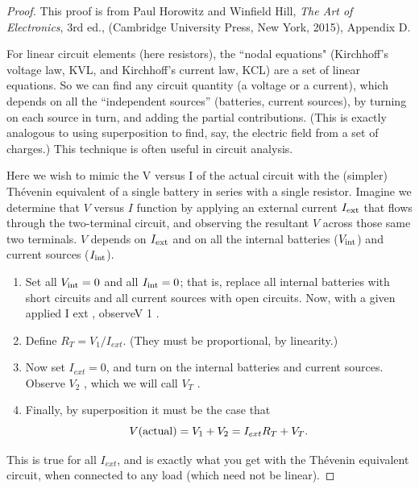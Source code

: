 \documentclass[UTF8]{article}
\begin{document}
\begin{proof}
This proof is from Paul Horowitz and Winfield Hill, \textit{The Art of Electronics}, 
3rd ed., (Cambridge University Press, New York, 2015), Appendix D.

For linear circuit elements (here resistors), the ``nodal 
equations" (Kirchhoff's voltage law, KVL, and Kirchhoff's current 
law, KCL) are a set of linear equations. So we can
find any circuit quantity (a voltage or a current), which depends 
on all the ``independent sources'' (batteries, current
sources), by turning on each source in turn, and adding the
partial contributions. (This is exactly analogous to using
superposition to find, say, the electric field from a set of
charges.) This technique is often useful in circuit analysis.

Here we wish to mimic the V versus I of the actual circuit 
with the (simpler) Th\'{e}venin equivalent of a single battery 
in series with a single resistor. Imagine we determine
that $V$ versus $I$ function by applying an external current $I_{\rm ext}$
that flows through the two-terminal circuit, and observing
the resultant $V$ across those same two terminals. $V$ depends
on $I_{\rm ext}$ and on all the internal batteries ($V_{\rm int}$) and current
sources ($I_{\rm int}$).
\begin{enumerate}
\item Set all $V_{\rm int}=0$ and all $I_{\rm int}=0$; that is, replace all internal
batteries with short circuits and all current sources with
open circuits. Now, with a given applied I ext , observeV 1 .
\item Define $R_{T} = V_1 /I_{ext} $. (They must be proportional, by linearity.)
\item Now set $I_{ext} = 0$, and turn on the internal batteries and
current sources. Observe $V_2$ , which we will call $V_T$ .
\item Finally, by superposition it must be the case that
\[
V({\rm actual}) =V_1 +V_2 = I_{ext} R_{T} +V_{T} .
\]
\end{enumerate}

This is true for all $I_{ext} $, and is exactly what you get with
the  Th\'{e}venin equivalent circuit, when connected to any
load (which need not be linear).
\end{proof}
%
\end{document}
